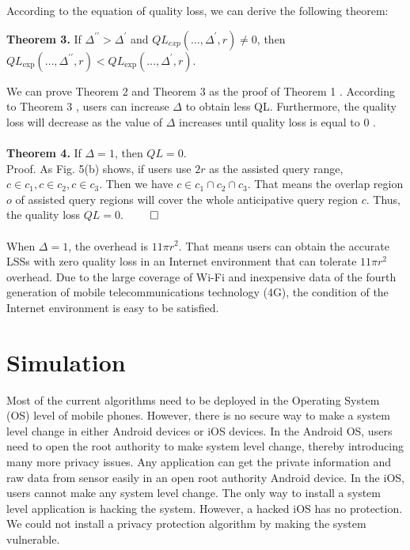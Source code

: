 \documentclass[a4paper,fleqn]{cas-dc}
\begin{document}
According to the equation of quality loss, we can derive the following theorem:

\textbf{Theorem 3.} If $\Delta^{\prime \prime}>\Delta^{\prime}$ and $Q L_{e x p}\left(\ldots, \Delta^{\prime}, r\right) \neq 0$, then $Q L_{\exp }\left(\ldots, \Delta^{\prime \prime}, r\right)<Q L_{\exp }\left(\ldots, \Delta^{\prime}, r\right)$.

We can prove Theorem 2 and Theorem 3 as the proof of Theorem 1 . According to Theorem 3 , users can increase $\Delta$ to obtain less QL. Furthermore, the quality loss will decrease as the value of $\Delta$ increases until quality loss is equal to 0 . \\ \\ 
\textbf{Theorem 4.} If $\Delta=1$, then $Q L=0$. \\

Proof. As Fig. 5(b) shows, if users use $2 r$ as the assisted query range, $c \in c_{1}, c \in c_{2}, c \in c_{3}$. Then we have $c \in c_{1} \cap c_{2} \cap c_{3}$. That means the overlap region $o$ of assisted query regions will cover the whole anticipative query region $c$. Thus, the quality loss $Q L=0$. $\qed$ \\ \\

When $\Delta=1$, the overhead is $11 \pi r^{2}$. That means users can obtain the accurate LSSs with zero quality loss in an Internet environment that can tolerate $11 \pi r^{2}$ overhead. Due to the large coverage of Wi-Fi and inexpensive data of the fourth generation of mobile telecommunications technology (4G), the condition of the Internet environment is easy to be satisfied.
\\
\section{Simulation}

Most of the current algorithms need to be deployed in the Operating System (OS) level of mobile phones. However, there is no secure way to make a system level change in either Android devices or iOS devices. In the Android OS, users need to open the root authority to make system level change, thereby introducing many more privacy issues. Any application can get the private information and raw data from sensor easily in an open root authority Android device. In the iOS, users cannot make any system level change. The only way to install a system level application is hacking the system. However, a hacked iOS has no protection. We could not install a privacy protection algorithm by making the system vulnerable.
\end{document}
